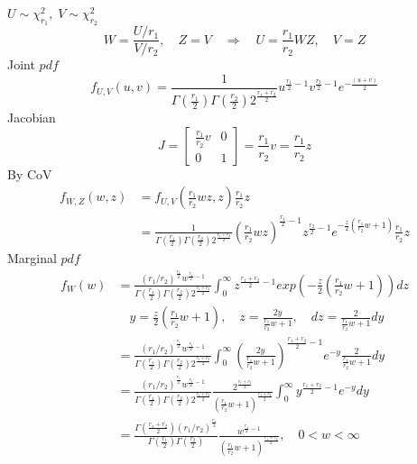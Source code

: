 \documentclass{oblivoir}
\begin{document}
\begin{enumerate}
$U \sim \chi^{2}_{r_1}, \; V \sim \chi^{2}_{r_2}$
$$
W = \frac{U / r_1}{V / r_2} ,\quad Z = V \quad \Rightarrow \quad U = \frac{r_1}{r_2} W Z , \quad V = Z
$$
Joint $pdf$
$$
f_{U,V}(u,v) = \frac{1}{\Gamma(\frac{r_1}{2}) \Gamma(\frac{r_2}{2}) 2^{\frac{r_1+r_2}{2}}} u^{\frac{r_1}{2} - 1} v^{\frac{r_2}{2} - 1} e^{- \frac{(u + v)}{2} }
$$
Jacobian
$$
J = 
\begin{bmatrix}
\frac{r_1}{r_2} v & 0 \\
0 & 1 
\end{bmatrix}
= \frac{r_1}{r_2} v
= \frac{r_1}{r_2} z
$$
By CoV
\begin{align*}
f_{W,Z}(w,z) &= f_{U,V}(\frac{r_1}{r_2} wz, z) \frac{r_1}{r_2}z \\
&= \frac{1}{\Gamma(\frac{r_1}{2}) \Gamma(\frac{r_2}{2}) 2^{\frac{r_1+r_2}{2}}} (\frac{r_1}{r_2} wz)^{\frac{r_1}{2} - 1} z^{\frac{r_2}{2} - 1} e^{- \frac{z}{2} (\frac{r_1}{r_2} w + 1)} \frac{r_1}{r_2} z
\end{align*}
Marginal $pdf$
\begin{align*}
f_W(w) &= \frac{(r_1/r_2)^{\frac{r_1}{2}} w^{\frac{r_1}{2} - 1}}{\Gamma(\frac{r_1}{2}) \Gamma(\frac{r_2}{2}) 2^{\frac{r_1+r_2}{2}}} \int_0^{\infty} z^{\frac{r_1 + r_2}{2} - 1} exp \left( - \frac{z}{2} (\frac{r_1}{r_2} w + 1)\right) dz \\
& \quad y = \frac{z}{2} (\frac{r_1}{r_2} w + 1), \quad z = \frac{2y}{\frac{r_1}{r_2} w + 1}, \quad dz =  \frac{2}{\frac{r_1}{r_2} w + 1}dy \\
&= \frac{(r_1/r_2)^{\frac{r_1}{2}} w^{\frac{r_1}{2} - 1}}{\Gamma(\frac{r_1}{2}) \Gamma(\frac{r_2}{2}) 2^{\frac{r_1+r_2}{2}}} \int_0^{\infty} \left( \frac{2y}{\frac{r_1}{r_2} w + 1} \right)^{\frac{r_1 + r_2}{2} - 1} e^{-y}  \frac{2}{\frac{r_1}{r_2} w + 1}dy \\
&= \frac{(r_1/r_2)^{\frac{r_1}{2}} w^{\frac{r_1}{2} - 1}}{\Gamma(\frac{r_1}{2}) \Gamma(\frac{r_2}{2}) 2^{\frac{r_1+r_2}{2}}} \frac{2^{\frac{r_1+r_2}{2}}}{(\frac{r_1}{r_2}w + 1)^{\frac{r_1+r_2}{2}}} \int_0^{\infty} y^{\frac{r_1+r_2}{2} - 1} e^{-y} dy \\
&= \frac{\Gamma(\frac{r_1+r_2}{2})(r_1/r_2)^{\frac{r_1}{2}}}{\Gamma(\frac{r_1}{2}) \Gamma(\frac{r_2}{2})} \frac{w^{\frac{r_1}{2} - 1}}{(\frac{r_1}{r_2}w + 1)^{\frac{r_1+r_2}{2}}}, \quad 0 <  w < \infty
\end{align*}

\end{enumerate}
\end{document}
